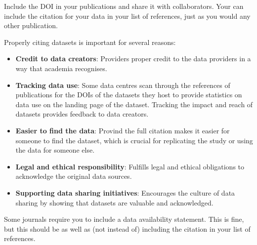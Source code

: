 \documentclass[a4paper,12pt]{article}
\begin{document}
Include the DOI in your publications and share it with collaborators. Your can include the citation for your data in your list of references, just as you would any other publication. 

Properly citing datasets is important for several reasons:
\begin{itemize}
    \item \textbf{Credit to data creators}: Providers proper credit to the data providers in a way that academia recognises. 
    \item \textbf{Tracking data use}: Some data centres scan through the references of publications for the DOIs of the datasets they host to provide statistics on data use on the landing page of the dataset. Tracking the impact and reach of datasets provides feedback to data creators.  
    \item \textbf{Easier to find the data}: Provind the full citation makes it easier for someone to find the dataset, which is crucial for replicating the study or using the data for someone else.
    \item \textbf{Legal and ethical responsibility}: Fulfills legal and ethical obligations to acknowledge the original data sources.
    \item \textbf{Supporting data sharing initiatives}: Encourages the culture of data sharing by showing that datasets are valuable and acknowledged.
\end{itemize}

Some journals require you to include a data availability statement. This is fine, but this should be as well as (not instead of) including the citation in your list of references.


\end{document}
